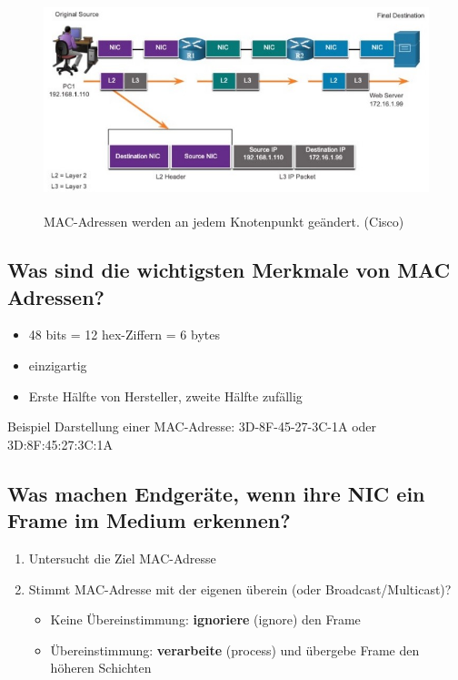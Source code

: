\begin{figure}[H]
    \begin{center}
    \label{pic:DataLinkFrameAddresses}
    \includegraphics[width=\textwidth]{images/Data_Link_Frame_Addresses.jpg}
    \caption{MAC-Adressen werden an jedem Knotenpunkt geändert. (\textsuperscript{\textcopyright}Cisco)}
    \end{center}
\end{figure}

\subsection*{Was sind die wichtigsten Merkmale von MAC Adressen?}
\begin{itemize}
    \item 48 bits = 12 hex-Ziffern = 6 bytes
    \item einzigartig
    \item Erste Hälfte von Hersteller, zweite Hälfte zufällig
\end{itemize}
Beispiel Darstellung einer MAC-Adresse: 3D-8F-45-27-3C-1A oder 3D:8F:45:27:3C:1A

\subsection*{Was machen Endgeräte, wenn ihre NIC ein Frame im Medium erkennen?}\label{sub:Frameerkennung}
\begin{enumerate}
    \item Untersucht die Ziel MAC-Adresse
    \item Stimmt MAC-Adresse mit der eigenen überein (oder Broadcast/Multicast)?
    \begin{itemize}
        \item Keine Übereinstimmung: \textbf{ignoriere} (ignore) den Frame
        \item Übereinstimmung: \textbf{verarbeite} (process) und übergebe Frame den höheren Schichten
    \end{itemize}
\end{enumerate}

